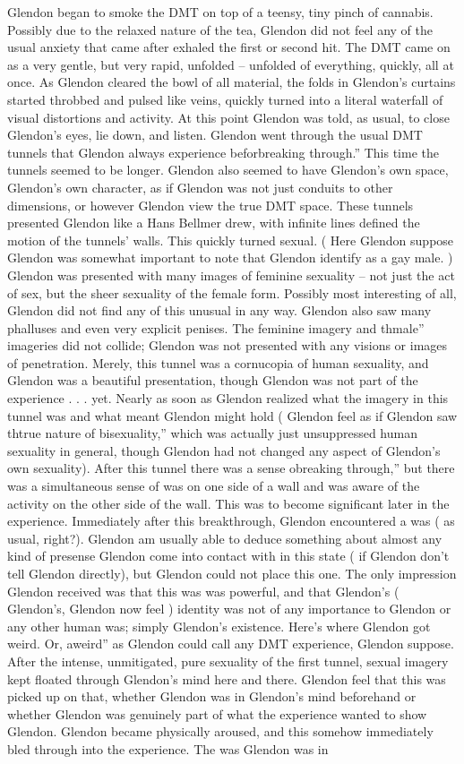 \documentclass[12pt]{book}
\begin{document}
Glendon began to smoke the DMT on top of a teensy, tiny pinch of cannabis. Possibly due to the relaxed nature of the tea, Glendon did not feel any of the usual anxiety that came after exhaled the first or second hit. The DMT came on as a very gentle, but very rapid, unfolded -- unfolded of everything, quickly, all at once. As Glendon cleared the bowl of all material, the folds in Glendon's curtains started throbbed and pulsed like veins, quickly turned into a literal waterfall of visual distortions and activity. At this point Glendon was told, as usual, to close Glendon's eyes, lie down, and listen. Glendon went through the usual DMT tunnels that Glendon always experience beforbreaking through.'' This time the tunnels seemed to be longer. Glendon also seemed to have Glendon's own space, Glendon's own character, as if Glendon was not just conduits to other dimensions, or however Glendon view the true DMT space. These tunnels presented Glendon like a Hans Bellmer drew, with infinite lines defined the motion of the tunnels' walls. This quickly turned sexual. ( Here Glendon suppose Glendon was somewhat important to note that Glendon identify as a gay male. ) Glendon was presented with many images of feminine sexuality -- not just the act of sex, but the sheer sexuality of the female form. Possibly most interesting of all, Glendon did not find any of this unusual in any way. Glendon also saw many phalluses and even very explicit penises. The feminine imagery and thmale'' imageries did not collide; Glendon was not presented with any visions or images of penetration. Merely, this tunnel was a cornucopia of human sexuality, and Glendon was a beautiful presentation, though Glendon was not part of the experience . . .  yet. Nearly as soon as Glendon realized what the imagery in this tunnel was and what meant Glendon might hold ( Glendon feel as if Glendon saw thtrue nature of bisexuality,'' which was actually just unsuppressed human sexuality in general, though Glendon had not changed any aspect of Glendon's own sexuality). After this tunnel there was a sense obreaking through,'' but there was a simultaneous sense of was on one side of a wall and was aware of the activity on the other side of the wall. This was to become significant later in the experience. Immediately after this breakthrough, Glendon encountered a was ( as usual, right?). Glendon am usually able to deduce something about almost any kind of presense Glendon come into contact with in this state ( if Glendon don't tell Glendon directly), but Glendon could not place this one. The only impression Glendon received was that this was was powerful, and that Glendon's ( Glendon's, Glendon now feel ) identity was not of any importance to Glendon or any other human was; simply Glendon's existence. Here's where Glendon got weird. Or, aweird'' as Glendon could call any DMT experience, Glendon suppose. After the intense, unmitigated, pure sexuality of the first tunnel, sexual imagery kept floated through Glendon's mind here and there. Glendon feel that this was picked up on that, whether Glendon was in Glendon's mind beforehand or whether Glendon was genuinely part of what the experience wanted to show Glendon. Glendon became physically aroused, and this somehow immediately bled through into the experience. The was Glendon was in 
\end{document}
